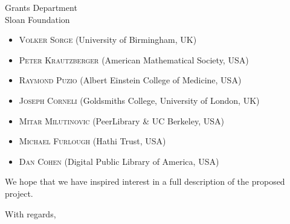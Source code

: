 \documentclass{letter}
\begin{document}
\begin{letter}{Grants Department \\ Sloan Foundation}
\begin{itemize}[label={},itemsep=-5pt]
\item {\scshape Volker Sorge} (University of Birmingham, UK)\\
\item {\scshape Peter Krautzberger} (American Mathematical Society, USA)\\ 
\item {\scshape Raymond Puzio} (Albert Einstein College of Medicine, USA) \\
\item {\scshape Joseph Corneli} (Goldsmiths College, University of London, UK) \\
\item {\scshape Mitar Milutinovic} (PeerLibrary \& UC Berkeley, USA) \\
\item {\scshape Michael Furlough} (Hathi Trust, USA) \\
\item {\scshape Dan Cohen} (Digital Public Library of America, USA)
\end{itemize}

We hope that we have inspired interest in a full description of the
proposed project.

\closing{With regards,}
\end{letter}


\end{document}
